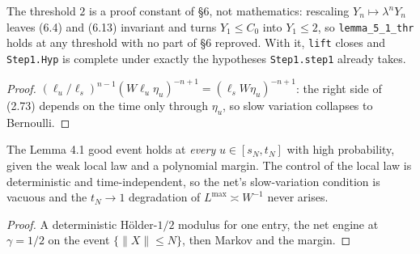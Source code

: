 \begin{theorem}\label{thm:step1lift}
  \leanok{}
  The threshold $2$ is a proof constant of \S6, not mathematics: rescaling $Y_n\mapsto\lambda^nY_n$
  leaves (6.4) and (6.13) invariant and turns $Y_1\le C_0$ into $Y_1\le2$, so
  \texttt{lemma\_5\_1\_thr} holds at any threshold with no part of \S6 reproved. With it,
  \texttt{lift} closes and \texttt{Step1.Hyp} is complete under exactly the hypotheses
  \texttt{Step1.step1} already takes.
\end{theorem}
\begin{proof}\leanok
  $(\ell_u/\ell_s)^{n-1}(W\ell_u\eta_u)^{-n+1}=(\ell_sW\eta_u)^{-n+1}$: the right side of (2.73)
  depends on the time only through $\eta_u$, so slow variation collapses to Bernoulli.
\end{proof}

\begin{lemma}\label{lem:goodsetflow}
  \leanok{}
  The Lemma 4.1 good event holds at \emph{every} $u\in[s_N,t_N]$ with high probability, given the
  weak local law and a polynomial margin. The control of the local law is deterministic and
  time-independent, so the net's slow-variation condition is vacuous and the $t_N\to1$ degradation
  of $L^{\max}\asymp W^{-1}$ never arises.
\end{lemma}
\begin{proof}\leanok
  A deterministic H\"older-$1/2$ modulus for one entry, the net engine at $\gamma=1/2$ on the event
  $\{\|X\|\le N\}$, then Markov and the margin.
\end{proof}


